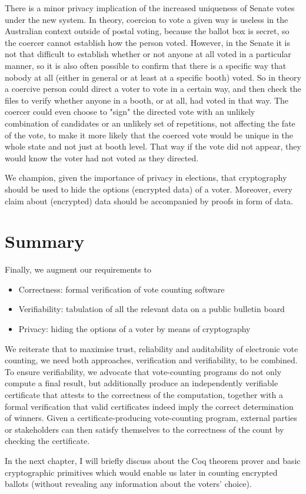    \begin{displayquote}
   
   There is a minor privacy implication of the increased uniqueness of Senate votes under the new system.  In theory, coercion to 
   vote a given way is useless in the Australian context outside of postal voting, because the ballot box is secret, so the coercer 
   cannot establish how the person voted.  However, in the Senate it is not that difficult to establish whether or not anyone at all 
   voted in a particular manner, so it is also often possible to confirm that there is a specific way that nobody at all (either in general or 
   at least at a specific booth) voted.   So in theory a coercive person could direct a voter to vote in a certain way, and then check the 
   files to verify whether anyone in a booth, or at all, had voted in that way. The coercer could even choose to "sign" the directed vote 
   with an unlikely combination of candidates or an unlikely set of repetitions, not affecting the fate of the vote, to make it more likely 
   that the coerced vote would be unique in the whole state and not just at booth level.  That way if the vote did not appear, they 
   would know the voter had not voted as they directed.
   
   \end{displayquote}
   
   
   We champion, given the importance of privacy in elections,  that cryptography should be 
   used to hide the options (encrypted data) of a voter.  Moreover, every claim about (encrypted) data 
   should be accompanied by proofs in form of data.  
   
   
   
\section{Summary}
\label{secback:summary_back}

Finally,  we augment our requirements to
   \begin{itemize}
   \item Correctness: formal verification of vote counting software
   \item Verifiability: tabulation of all the relevant data on a public bulletin board
   \item Privacy: hiding the options of a voter by means of cryptography 
   \end{itemize}
   
We reiterate that to maximise trust, reliability and auditability of electronic vote counting, we
need both approaches, verification and verifiability, to be combined. To ensure
verifiability, we advocate that vote-counting programs
do not only compute a final result, but additionally produce an
independently verifiable certificate that attests to the correctness
of the computation, together with a formal verification that
valid certificates indeed imply the correct determination of
winners. Given a certificate-producing vote-counting program, external
parties or stakeholders can then satisfy themselves to the
correctness of the count by checking the certificate.    

In the next chapter, I will  briefly discuss about the Coq theorem prover and basic cryptographic primitives which 
would enable us later in counting encrypted ballots (without revealing any information about the
voters' choice).